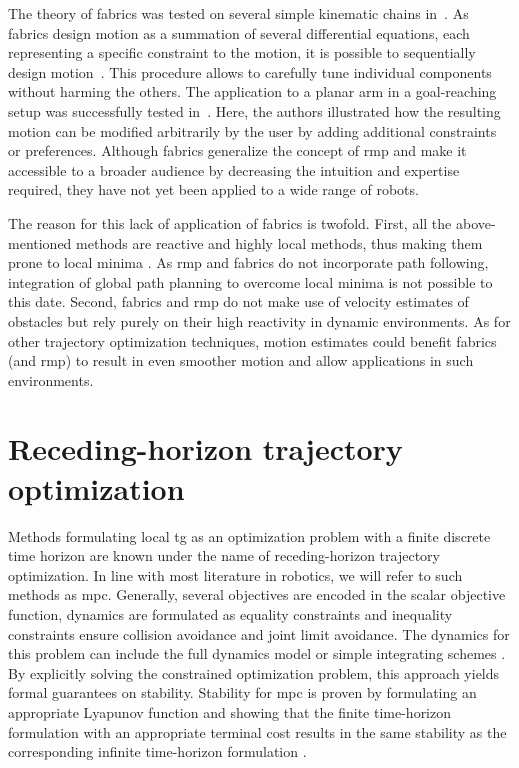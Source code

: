 The theory of \ac{fabrics} was tested on several simple
kinematic chains in~\cite{Ratliff2020,Ratliff2021}. As
\ac{fabrics} design motion as a summation of several
differential equations, each representing a specific
constraint to the motion, it is possible to sequentially
design motion~\cite{Ratliff2020}. This procedure allows to
carefully tune individual components without harming the
others. The application to a planar arm in a goal-reaching
setup was successfully tested in~\cite{Ratliff2020}. Here,
the authors illustrated how the resulting motion can be
modified arbitrarily by the user by adding additional
constraints or preferences. Although \ac{fabrics} generalize
the concept of \ac{rmp} and make it accessible to a broader
audience by decreasing the intuition and expertise required,
they have not yet been applied to a wide range of robots. 

The reason for this lack of application of \ac{fabrics} is
twofold. First, all the above-mentioned methods are reactive
and highly local methods, thus making them prone to local
minima \cite{bhardwaj2022storm}. As \ac{rmp} and
\ac{fabrics} do not incorporate path following, integration
of global path planning to overcome local minima is not
possible to this date. Second, \ac{fabrics} and \ac{rmp} do
not make use of velocity estimates of obstacles but rely
purely on their high reactivity in dynamic environments. As
for other trajectory optimization techniques, motion
estimates could benefit \ac{fabrics} (and \ac{rmp}) to
result in even smoother motion and allow applications in
such environments. 


\section{Receding-horizon trajectory optimization}%
\label{sec:receding_horizon_trajectory_optimization}

Methods formulating local \ac{tg} as an optimization problem with a finite
discrete time horizon are known under the name of receding-horizon trajectory
optimization. In line with most literature in robotics, we will refer to such
methods as \ac{mpc}.
Generally, several objectives are encoded in the scalar
objective function, dynamics
are formulated as equality constraints and inequality constraints ensure
collision avoidance and joint limit avoidance. The dynamics for this problem can
include the full dynamics model or simple integrating
schemes \cite{hewing2020learning}.
By explicitly solving the constrained optimization problem, this approach yields
formal guarantees on stability. Stability for \ac{mpc} is proven by formulating
an appropriate Lyapunov function and showing that the finite time-horizon
formulation with an appropriate terminal cost results in the same stability as
the corresponding infinite time-horizon formulation
\cite{l1,l4,keerthi1988optimal}. 

